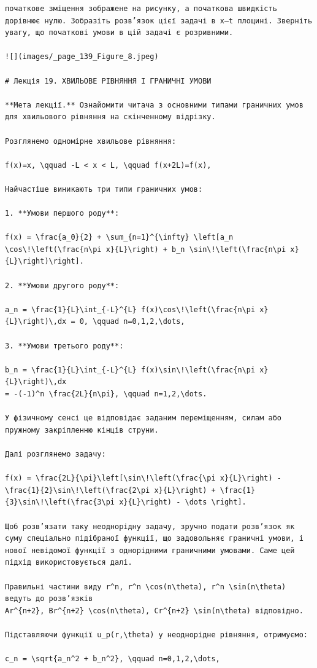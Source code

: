 \documentclass[
  ukrainian,
]{article}
\begin{document}
\begin{verbatim}
початкове зміщення зображене на рисунку, а початкова швидкість дорівнює нулю. Зобразіть розв’язок цієї задачі в x–t площині. Зверніть увагу, що початкові умови в цій задачі є розривними.

![](images/_page_139_Figure_8.jpeg)

# Лекція 19. ХВИЛЬОВЕ РІВНЯННЯ І ГРАНИЧНІ УМОВИ

**Мета лекції.** Ознайомити читача з основними типами граничних умов для хвильового рівняння на скінченному відрізку.

Розглянемо одномірне хвильове рівняння:

f(x)=x, \qquad -L < x < L, \qquad f(x+2L)=f(x),

Найчастіше виникають три типи граничних умов:

1. **Умови першого роду**:

f(x) = \frac{a_0}{2} + \sum_{n=1}^{\infty} \left[a_n \cos\!\left(\frac{n\pi x}{L}\right) + b_n \sin\!\left(\frac{n\pi x}{L}\right)\right].

2. **Умови другого роду**:

a_n = \frac{1}{L}\int_{-L}^{L} f(x)\cos\!\left(\frac{n\pi x}{L}\right)\,dx = 0, \qquad n=0,1,2,\dots,

3. **Умови третього роду**:

b_n = \frac{1}{L}\int_{-L}^{L} f(x)\sin\!\left(\frac{n\pi x}{L}\right)\,dx
= -(-1)^n \frac{2L}{n\pi}, \qquad n=1,2,\dots.

У фізичному сенсі це відповідає заданим переміщенням, силам або пружному закріпленню кінців струни.

Далі розглянемо задачу:

f(x) = \frac{2L}{\pi}\left[\sin\!\left(\frac{\pi x}{L}\right) - \frac{1}{2}\sin\!\left(\frac{2\pi x}{L}\right) + \frac{1}{3}\sin\!\left(\frac{3\pi x}{L}\right) - \dots \right].

Щоб розв’язати таку неоднорідну задачу, зручно подати розв’язок як суму спеціально підібраної функції, що задовольняє граничні умови, і нової невідомої функції з однорідними граничними умовами. Саме цей підхід використовується далі.

Правильні частини виду r^n, r^n \cos(n\theta), r^n \sin(n\theta) ведуть до розв’язків  
Ar^{n+2}, Br^{n+2} \cos(n\theta), Cr^{n+2} \sin(n\theta) відповідно.

Підставляючи функції u_p(r,\theta) у неоднорідне рівняння, отримуємо:

c_n = \sqrt{a_n^2 + b_n^2}, \qquad n=0,1,2,\dots,


\end{verbatim}
\end{document}
